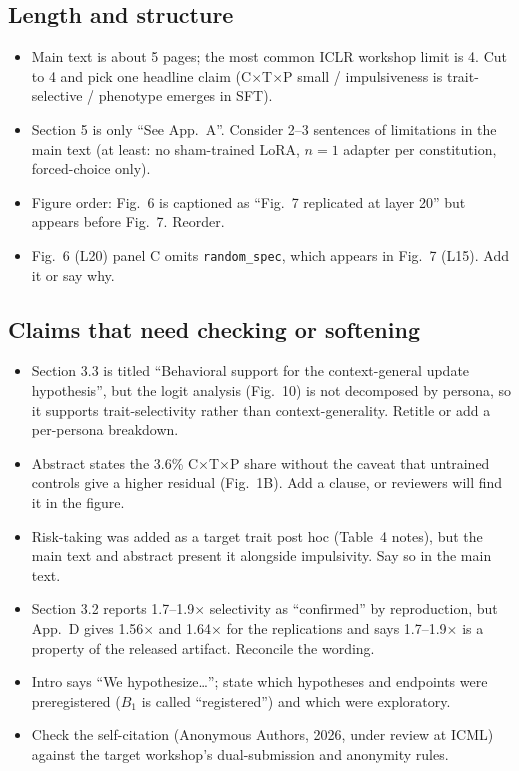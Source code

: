 \documentclass{article}
\begin{document}
\subsection*{Length and structure}
\begin{itemize}
  \item Main text is about 5 pages; the most common ICLR workshop limit is 4. Cut to 4 and pick one headline claim (C$\times$T$\times$P small / impulsiveness is trait-selective / phenotype emerges in SFT).
  \item Section 5 is only ``See App.~A''. Consider 2--3 sentences of limitations in the main text (at least: no sham-trained LoRA, $n=1$ adapter per constitution, forced-choice only).
  \item Figure order: Fig.~6 is captioned as ``Fig.~7 replicated at layer 20'' but appears before Fig.~7. Reorder.
  \item Fig.~6 (L20) panel C omits \texttt{random\_spec}, which appears in Fig.~7 (L15). Add it or say why.
\end{itemize}

\subsection*{Claims that need checking or softening}
\begin{itemize}
  \item Section 3.3 is titled ``Behavioral support for the context-general update hypothesis'', but the logit analysis (Fig.~10) is not decomposed by persona, so it supports trait-selectivity rather than context-generality. Retitle or add a per-persona breakdown.
  \item Abstract states the 3.6\% C$\times$T$\times$P share without the caveat that untrained controls give a higher residual (Fig.~1B). Add a clause, or reviewers will find it in the figure.
  \item Risk-taking was added as a target trait post hoc (Table~4 notes), but the main text and abstract present it alongside impulsivity. Say so in the main text.
  \item Section 3.2 reports 1.7--1.9$\times$ selectivity as ``confirmed'' by reproduction, but App.~D gives 1.56$\times$ and 1.64$\times$ for the replications and says 1.7--1.9$\times$ is a property of the released artifact. Reconcile the wording.
  \item Intro says ``We hypothesize\ldots''; state which hypotheses and endpoints were preregistered ($B_1$ is called ``registered'') and which were exploratory.
  \item Check the self-citation (Anonymous Authors, 2026, under review at ICML) against the target workshop's dual-submission and anonymity rules.
\end{itemize}
\end{document}

